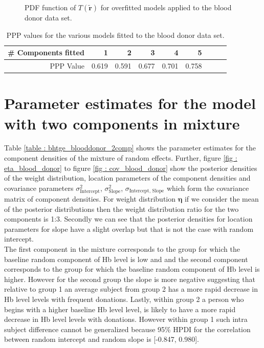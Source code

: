 \begin{figure}[!htb]
	\caption{PDF function of $T(\boldsymbol{\tilde{r}})$ for overfitted models applied to the blood donor data set.}
	\label{fig : ppc_blood_donor_overfitted}    
\end{figure} 

\begin{table}[!htb]
\centering
\captionsetup{justification=centering}
\caption{PPP values for the various models fitted to the blood donor data set.}
\label{table : ppp_blood_donor}
\begin{tabular}{@{}rrrrrrrrr@{}}
\toprule
\# Components fitted & 1 & 2 & 3 & 4 & 5\\ \midrule
PPP Value & 0.619 & 0.591 & 0.677 & 0.701 & 0.758\\ \bottomrule
\end{tabular}
\end{table}

\section{Parameter estimates for the model with two components in mixture}
Table \ref{table : bhtge_blooddonor_2comp} shows the parameter estimates for the component densities of the mixture of random effects. Further, figure \ref{fig : eta_blood_donor} to figure \ref{fig : cov_blood_donor} show the posterior densities of the weight distribution, location parameters of the component densities and covariance parameters $\sigma^2_\text{Intercept}$, $\sigma^2_\text{Slope}$, $\sigma_\text{Intercept, Slope}$ which form the covariance matrix of component densities. For weight distribution $\boldsymbol{\eta}$ if we consider the mean of the posterior distributions then the weight distribution ratio for the two components is 1:3. Secondly we can see that the posterior densities for location parameters for slope have a slight overlap but that is not the case with random intercept.\\

The first component in the mixture corresponds to the group for which the baseline random component of Hb level is low and and the second component corresponds to the group for which the baseline random component of Hb level is higher. However for the second group the slope is more negative suggesting that relative to group 1 an average subject from group 2 has a more rapid decrease in Hb level levels with frequent donations. Lastly, within group 2 a person who begins with a higher baseline Hb level level, is likely to have a more rapid decrease in Hb level levels with donations. However within group 1 such intra subject difference cannot be generalized because 95\% HPDI for the correlation between random intercept and random slope is [-0.847, 0.980].\\

